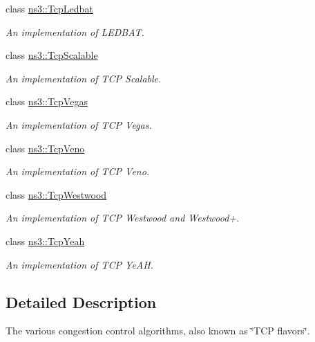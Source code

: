 \begin{DoxyCompactItemize}
class \hyperlink{classns3_1_1TcpLedbat}{ns3\+::\+Tcp\+Ledbat}
\begin{DoxyCompactList}\small\item\em An implementation of L\+E\+D\+B\+AT. \end{DoxyCompactList}\item 
class \hyperlink{classns3_1_1TcpScalable}{ns3\+::\+Tcp\+Scalable}
\begin{DoxyCompactList}\small\item\em An implementation of T\+CP Scalable. \end{DoxyCompactList}\item 
class \hyperlink{classns3_1_1TcpVegas}{ns3\+::\+Tcp\+Vegas}
\begin{DoxyCompactList}\small\item\em An implementation of T\+CP Vegas. \end{DoxyCompactList}\item 
class \hyperlink{classns3_1_1TcpVeno}{ns3\+::\+Tcp\+Veno}
\begin{DoxyCompactList}\small\item\em An implementation of T\+CP Veno. \end{DoxyCompactList}\item 
class \hyperlink{classns3_1_1TcpWestwood}{ns3\+::\+Tcp\+Westwood}
\begin{DoxyCompactList}\small\item\em An implementation of T\+CP Westwood and Westwood+. \end{DoxyCompactList}\item 
class \hyperlink{classns3_1_1TcpYeah}{ns3\+::\+Tcp\+Yeah}
\begin{DoxyCompactList}\small\item\em An implementation of T\+CP Ye\+AH. \end{DoxyCompactList}\end{DoxyCompactItemize}


\subsection{Detailed Description}
The various congestion control algorithms, also known as \char`\"{}\+T\+C\+P flavors\char`\"{}. 
